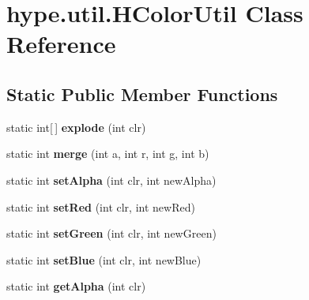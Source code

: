 \hypertarget{classhype_1_1util_1_1_h_color_util}{\section{hype.\-util.\-H\-Color\-Util Class Reference}
\label{classhype_1_1util_1_1_h_color_util}
}
\subsection*{Static Public Member Functions}
\begin{DoxyCompactItemize}
\item 
\hypertarget{classhype_1_1util_1_1_h_color_util_a61666a2832863a3868acca5ae680b3e8}{static int\mbox{[}$\,$\mbox{]} {\bfseries explode} (int clr)}\label{classhype_1_1util_1_1_h_color_util_a61666a2832863a3868acca5ae680b3e8}

\item 
\hypertarget{classhype_1_1util_1_1_h_color_util_aaf8e880d254f071d6ab8cf91f016760d}{static int {\bfseries merge} (int a, int r, int g, int b)}\label{classhype_1_1util_1_1_h_color_util_aaf8e880d254f071d6ab8cf91f016760d}

\item 
\hypertarget{classhype_1_1util_1_1_h_color_util_add8fde8a6ae35478d2aea48df979fc12}{static int {\bfseries set\-Alpha} (int clr, int new\-Alpha)}\label{classhype_1_1util_1_1_h_color_util_add8fde8a6ae35478d2aea48df979fc12}

\item 
\hypertarget{classhype_1_1util_1_1_h_color_util_a77c1dc20114fbf56c2bb014bf190686a}{static int {\bfseries set\-Red} (int clr, int new\-Red)}\label{classhype_1_1util_1_1_h_color_util_a77c1dc20114fbf56c2bb014bf190686a}

\item 
\hypertarget{classhype_1_1util_1_1_h_color_util_aabc476d0e464877a18bb5ee4a751bf48}{static int {\bfseries set\-Green} (int clr, int new\-Green)}\label{classhype_1_1util_1_1_h_color_util_aabc476d0e464877a18bb5ee4a751bf48}

\item 
\hypertarget{classhype_1_1util_1_1_h_color_util_a0f375222383f9687772b41ea22f2a965}{static int {\bfseries set\-Blue} (int clr, int new\-Blue)}\label{classhype_1_1util_1_1_h_color_util_a0f375222383f9687772b41ea22f2a965}

\item 
\hypertarget{classhype_1_1util_1_1_h_color_util_a62367754c43ab53594f1b6d0625e660f}{static int {\bfseries get\-Alpha} (int clr)}\label{classhype_1_1util_1_1_h_color_util_a62367754c43ab53594f1b6d0625e660f}


\end{DoxyCompactItemize}
